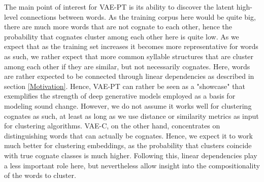 \documentclass[6pt]{article}
\begin{document}
The main point of interest for VAE-PT is its ability to discover the latent high-level connections between words. As the training corpus here would be quite big, there are much more words that are not cognate to each other, hence the probability that cognates cluster among each other here is quite low. As we expect that as the training set increases it becomes more representative for words as such, we rather expect that more common syllable structures that are cluster among each other if they are similar, but not necessarily cognates. Here, words are rather expected to be connected through linear dependencies as described in section \ref{Motivation}. Hence, VAE-PT can rather be seen as a "showcase" that exemplifies the strength of deep generative models employed as a basis for modeling sound change. However, we do not assume it works well for clustering cognates as such, at least as long as we use distance or similarity metrics as input for clustering algorithms.
VAE-C, on the other hand, concentrates on distinguishing words that can actually be cognates. Hence, we expect it to work much better for clustering embeddings, as the probability that clusters coincide with true cognate classes is much higher. Following this, linear dependencies play a less important role here, but nevertheless allow insight into the compositionality of the words to cluster.
\end{document}
